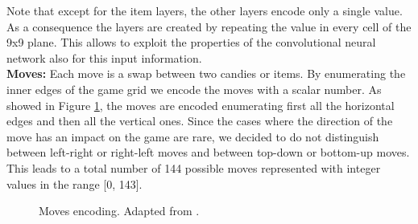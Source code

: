 Note that except for the item layers, the other layers encode only a single value. As a consequence the layers are created by repeating the value in every cell of the 9x9 plane. This allows to exploit the properties of the convolutional neural network also for this input information. \\

\noindent
\textbf{Moves:}
 Each move is a swap between two candies or items. By enumerating the inner edges of the game grid we encode the moves with a scalar number.  As showed in Figure \ref{fig:moves_encoding}, the moves are encoded enumerating first all the horizontal edges and then all the vertical ones. Since the cases where the direction of the move has an impact on the game are rare, we decided to do not distinguish between left-right or right-left moves and between top-down or bottom-up moves. This leads to a total number of 144 possible moves represented with integer values in the range [0, 143]. \\
 \begin{figure}[h!]
    \centering
    
    \caption{Moves encoding. Adapted from \cite{eisen_simulating_2017}.}
    \label{fig:moves_encoding}
\end{figure} 

